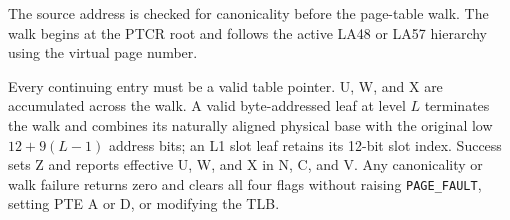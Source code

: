 The source address is checked for canonicality before the page-table walk. The walk begins at the PTCR root and follows the active LA48 or LA57 hierarchy using the virtual page number.

Every continuing entry must be a valid table pointer. U, W, and X are accumulated across the walk. A valid byte-addressed leaf at level $L$ terminates the walk and combines its naturally aligned physical base with the original low $12+9(L-1)$ address bits; an L1 slot leaf retains its 12-bit slot index. Success sets Z and reports effective U, W, and X in N, C, and V. Any canonicality or walk failure returns zero and clears all four flags without raising \texttt{PAGE\_FAULT}, setting PTE A or D, or modifying the TLB.
